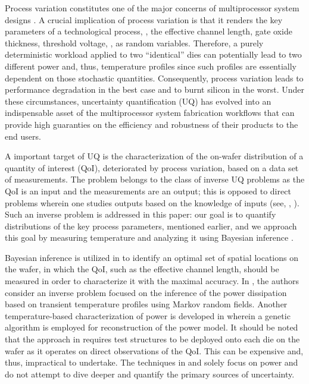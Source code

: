 Process variation constitutes one of the major concerns of multiprocessor system designs \cite{srivastava2010}. A crucial implication of process variation is that it renders the key parameters of a technological process, \eg, the effective channel length, gate oxide thickness, threshold voltage, \etc, as random variables.
Therefore, a purely deterministic workload applied to two ``identical'' dies can potentially lead to two different power and, thus, temperature profiles since such profiles are essentially dependent on those stochastic quantities. Consequently, process variation leads to performance degradation in the best case and to burnt silicon in the worst.
Under these circumstances, uncertainty quantification (UQ) has evolved into an indispensable asset of the multiprocessor system fabrication workflows that can provide high guaranties on the efficiency and robustness of their products to the end users.

A important target of UQ is the characterization of the on-wafer distribution of a quantity of interest (QoI), deteriorated by process variation, based on a data set of measurements. The problem belongs to the class of inverse UQ problems as the QoI is an input and the measurements are an output; this is opposed to direct problems wherein one studies outputs based on the knowledge of inputs (see, \eg, \cite{juan2011, juan2012}).
Such an inverse problem is addressed in this paper: our goal is to quantify distributions of the key process parameters, mentioned earlier, and we approach this goal by measuring temperature and analyzing it using Bayesian inference \cite{gelman2004}.

Bayesian inference is utilized in \cite{zhang2010} to identify an optimal set of spatial locations on the wafer, in which the QoI, such as the effective channel length, should be measured in order to characterize it with the maximal accuracy.
In \cite{paek2012}, the authors consider an inverse problem focused on the inference of the power dissipation based on transient temperature profiles using Markov random fields.
Another temperature-based characterization of power is developed in \cite{mesa-martinez2007} wherein a genetic algorithm is employed for reconstruction of the power model.
It should be noted that the approach in \cite{zhang2010} requires test structures to be deployed onto each die on the wafer as it operates on direct observations of the QoI. This can be expensive and, thus, impractical to undertake. The techniques in \cite{paek2012} and \cite{mesa-martinez2007} solely focus on power and do not attempt to dive deeper and quantify the primary sources of uncertainty.

